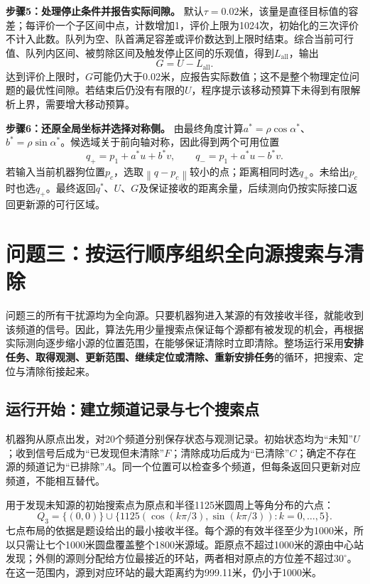 \documentclass[UTF8,a4paper,12pt,fontset=fandol]{ctexart}
\newcommand{\norm}[1]{\left\lVert#1\right\rVert}
\newcommand{\nextpage}{\clearpage}
\begin{document}
\noindent\textbf{步骤5：处理停止条件并报告实际间隙。}
默认$\tau=0.02$米，该量是直径目标值的容差；每评价一个子区间中点，计数增加1，评价上限为1024次，初始化的三次评价不计入此数。队列为空、队首满足容差或评价数达到上限时结束。综合当前可行值、队列内区间、被剪除区间及触发停止区间的乐观值，得到$L_{\mathrm{all}}$，输出
\begin{equation}
 G=U-L_{\mathrm{all}}.
\end{equation}
达到评价上限时，$G$可能仍大于0.02米，应报告实际数值；这不是整个物理定位问题的最优性间隙。若结束后仍没有有限的$U$，程序提示该移动预算下未得到有限解析上界，需要增大移动预算。

\noindent\textbf{步骤6：还原全局坐标并选择对称侧。}
由最终角度计算$a^*=\rho\cos\alpha^*$、$b^*=\rho\sin\alpha^*$。候选域关于前向轴对称，因此得到两个可用位置
\begin{equation}\label{eq:q2positions}
 q_+=p_1+a^*u+b^*v,\qquad q_-=p_1+a^*u-b^*v.
\end{equation}
若输入当前机器狗位置$p_c$，选取$\norm{q-p_c}$较小的点；距离相同时选$q_+$。未给出$p_c$时也选$q_+$。最终返回$q^*$、$U$、$G$及保证接收的距离余量，后续测向仍按实际接口返回更新源的可行区域。

\nextpage
\section{问题三：按运行顺序组织全向源搜索与清除}
问题三的所有干扰源均为全向源。只要机器狗进入某源的有效接收半径，就能收到该频道的信号。因此，算法先用少量搜索点保证每个源都有被发现的机会，再根据实际测向逐步缩小源的位置范围，在能够保证清除时立即清除。整场运行采用\textbf{安排任务、取得观测、更新范围、继续定位或清除、重新安排任务}的循环，把搜索、定位与清除衔接起来。

\subsection{运行开始：建立频道记录与七个搜索点}
机器狗从原点出发，对20个频道分别保存状态与观测记录。初始状态均为“未知”$U$；收到信号后成为“已发现但未清除”$F$；清除成功后成为“已清除”$C$；确定不存在源的频道记为“已排除”$A$。同一个位置可以检查多个频道，但每条返回只更新对应频道，不能相互替代。

用于发现未知源的初始搜索点为原点和半径1125米圆周上等角分布的六点：
\begin{equation}\label{eq:q3stations}
Q_3=\{(0,0)\}\cup\{1125(\cos(k\pi/3),\sin(k\pi/3)):k=0,\ldots,5\}.
\end{equation}
七点布局的依据是题设给出的最小接收半径。每个源的有效半径至少为1000米，所以只需让七个1000米圆盘覆盖整个1800米源域。距原点不超过1000米的源由中心站发现；外侧的源则分配给方位最接近的环站，两者相对原点的方位差不超过$30^\circ$。在这一范围内，源到对应环站的最大距离约为999.11米，仍小于1000米。
\end{document}
